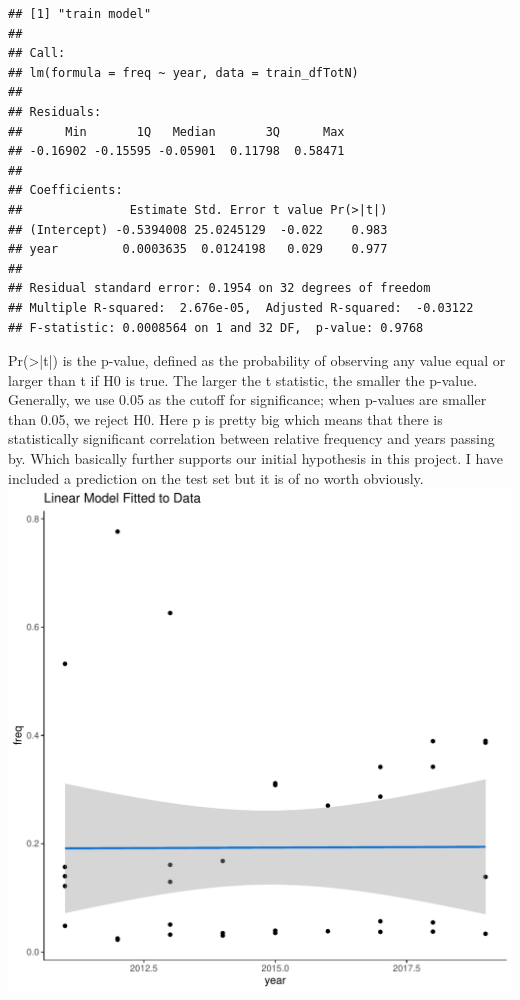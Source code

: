 \documentclass[10pt]{article}\usepackage[]{graphicx}\usepackage[]{color}
\makeatletter
\def\maxwidth{ %
  \ifdim\Gin@nat@width>\linewidth
    \linewidth
  \else
    \Gin@nat@width
  \fi
}
\newenvironment{kframe}{%
 \def\at@end@of@kframe{}%
 \ifinner\ifhmode%
  \def\at@end@of@kframe{\end{minipage}}%
  \begin{minipage}{\columnwidth}%
 \fi\fi%
 \def\FrameCommand##1{\hskip\@totalleftmargin \hskip-\fboxsep
 \colorbox{shadecolor}{##1}\hskip-\fboxsep
     \hskip-\linewidth \hskip-\@totalleftmargin \hskip\columnwidth}%
 \MakeFramed {\advance\hsize-\width
   \@totalleftmargin\z@ \linewidth\hsize
   \@setminipage}}%
 {\par\unskip\endMakeFramed%
 \at@end@of@kframe}
\newenvironment{knitrout}{}{} %
\makeatother
\begin{document}
\begin{knitrout}
\color{fgcolor}\begin{kframe}
\begin{verbatim}
## [1] "train model"
## 
## Call:
## lm(formula = freq ~ year, data = train_dfTotN)
## 
## Residuals:
##      Min       1Q   Median       3Q      Max 
## -0.16902 -0.15595 -0.05901  0.11798  0.58471 
## 
## Coefficients:
##               Estimate Std. Error t value Pr(>|t|)
## (Intercept) -0.5394008 25.0245129  -0.022    0.983
## year         0.0003635  0.0124198   0.029    0.977
## 
## Residual standard error: 0.1954 on 32 degrees of freedom
## Multiple R-squared:  2.676e-05,	Adjusted R-squared:  -0.03122 
## F-statistic: 0.0008564 on 1 and 32 DF,  p-value: 0.9768
\end{verbatim}
\end{kframe}
\end{knitrout}

Pr(>|t|) is the p-value, defined as the probability of observing any value equal or larger than t if H0 is true. The larger the t statistic, the smaller the p-value. Generally, we use 0.05 as the cutoff for significance; when p-values are smaller than 0.05, we reject H0. Here p is pretty big which means that there is statistically significant correlation between relative frequency and years passing by. Which basically further supports our initial hypothesis in this project. I have included a prediction on the test set but it is of no worth obviously.\\

\begin{knitrout}
\color{fgcolor}
\includegraphics[width=\maxwidth]{figure/unnamed-chunk-21-1} 

\end{knitrout}
\end{document}
